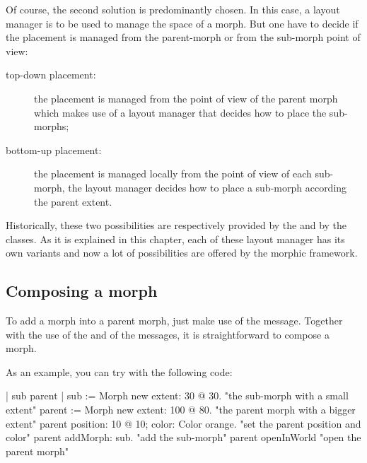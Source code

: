 \documentclass[a4paper,10pt,twoside]{book}
\begin{document}
Of course, the second solution is predominantly chosen. In this case, a layout manager is to be used to manage the space of a morph. But one have to decide if the placement is managed from the parent-morph or from the sub-morph point of view:
\begin{description}
\item[top-down placement:] the placement is managed from the point of view of the parent morph which makes use of a layout manager that decides how to place the sub-morphs;
\item[bottom-up placement:] the placement is managed locally from the point of view of each sub-morph, the layout manager decides how to place a sub-morph according the parent extent.
\end{description}
Historically, these two possibilities are respectively provided by the  and by the  classes. As it is explained in this chapter, each of these layout manager has its own variants and now a lot of possibilities are offered by the morphic framework.

\subsection{Composing a morph}
To add a morph into a parent morph, just make use of the  message. Together with the use of the  and of the  messages, it is straightforward to compose a morph.


As an example, you can try with the following code:

\begin{code}
| sub parent |
sub := Morph new extent: 30 @ 30. "the sub-morph with a small extent"
parent := Morph new extent: 100 @ 80. "the parent morph with a bigger extent"
parent position: 10 @ 10; color: Color orange. "set the parent position and color"
parent addMorph: sub. "add the sub-morph"
parent openInWorld "open the parent morph"
\end{code}
\end{document}

